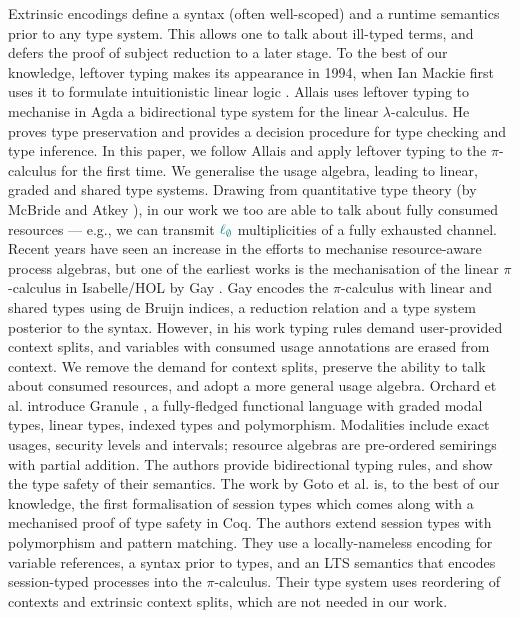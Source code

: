 \documentclass[runningheads]{llncs}
\newcommand{\lambdacalc}{$\lambda$-calculus}
\newcommand{\picalc}{$\pi$-calculus}
\newcommand{\func}[1]{\textcolor{teal}{\operatorname{#1}}}
\newcommand{\lz}{\func{\ell_{\emptyset}}}
\begin{document}
Extrinsic encodings define a syntax (often well-scoped) and a runtime semantics prior to any type system.
This allows one to talk about ill-typed terms, and defers the proof of subject reduction to a later stage.
%
To the best of our knowledge, leftover typing makes its appearance in 1994, when Ian Mackie first uses it to formulate intuitionistic linear logic \cite{Mackie}.
Allais \cite{Allais2018a} uses leftover typing to mechanise in Agda a bidirectional type system for the linear \lambdacalc{}.
He proves type preservation and provides a decision procedure for type checking and type inference.
In this paper, we follow Allais \cite{Allais2018a} and apply leftover typing to the \picalc{} for the first time.
We generalise the usage algebra, leading to linear, graded and shared type systems.
Drawing from quantitative type theory (by McBride and Atkey \cite{McBride2016,Atkey2018}), in our work we too are able to talk about fully consumed resources --- e.g., we can transmit $\lz$ multiplicities of a fully exhausted channel.
%
Recent years have seen an increase in the efforts to mechanise resource-aware process algebras, but one of the earliest works is the mechanisation of the linear \picalc{} in Isabelle/HOL by Gay \cite{Gay2001}.
Gay encodes the \picalc{} with linear and shared types using de Bruijn indices, a reduction relation and a type system posterior to the syntax.
However, in his work typing rules demand user-provided context splits, and variables with consumed usage annotations are erased from context.
We remove the demand for context splits, preserve the ability to talk about consumed resources, and adopt a more general usage algebra.
%
Orchard et al. introduce Granule \cite{Orchard}, a fully-fledged functional language with graded modal types, linear types, indexed types and polymorphism.
Modalities include exact usages, security levels and intervals; resource algebras are pre-ordered semirings with partial addition.
The authors provide bidirectional typing rules, and show the type safety of their semantics.
%
The work by Goto et al. \cite{Goto2016a} is, to the best of our knowledge, the first formalisation of session types which comes along with a mechanised proof of type safety in Coq.
The authors extend session types with polymorphism and pattern matching.
They use a locally-nameless encoding for variable references, a syntax prior to types, and an LTS semantics that encodes session-typed processes into the \picalc{}.
Their type system uses reordering of contexts and extrinsic context splits, which are not needed in our work. 
\end{document}
